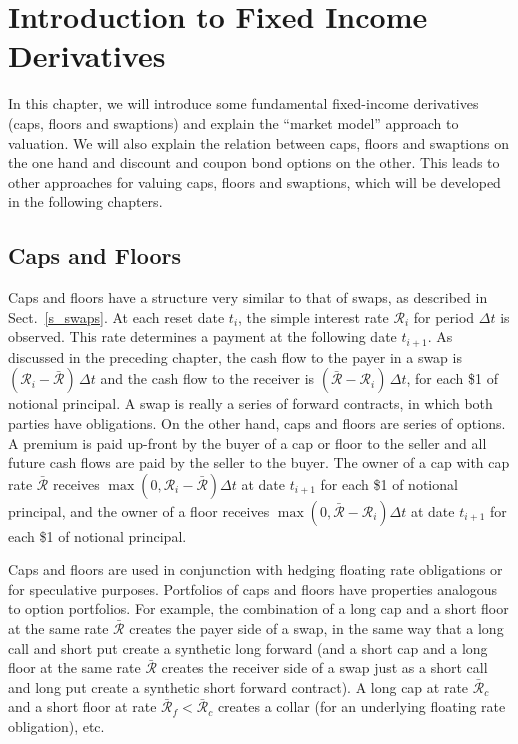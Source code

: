 \chapter{Introduction to Fixed Income Derivatives}\label{c_fixedincomederivatives}

In this chapter, we will introduce some fundamental fixed-income derivatives (caps, floors and swaptions) and explain the ``market model'' approach to valuation.  We will also explain the relation between caps, floors and swaptions on the one hand and discount and coupon bond options on the other.  This leads to other approaches for valuing caps, floors and swaptions, which will be developed in the following chapters.  

\section{Caps and Floors}

Caps  and floors  have a structure very similar to that of swaps, as described in Sect.~\ref{s_swaps}.  At each reset date $t_i$, the simple interest rate $\mathcal{R}_i$ for period $\varDelta t$ is observed.  This rate determines a payment at the following date $t_{i+1}$.  As discussed in the preceding chapter, the cash flow to the payer in a swap is $(\mathcal{R}_i - \bar{\mathcal{R}})\,\varDelta t$ and the cash flow to the receiver is $(\bar{\mathcal{R}}-\mathcal{R}_i)\,\varDelta t$, for each \$1 of notional principal.  A swap is really a series of forward contracts, in which both parties have obligations.  On the other hand, caps and floors are series of options.  A premium is paid up-front by the buyer of a cap or floor to the seller and all future cash flows are paid by the seller to the buyer.  The owner of a cap with cap rate $\bar{\mathcal{R}}$ receives $\max(0,\mathcal{R}_i-\bar{\mathcal{R}})\varDelta t$ at date $t_{i+1}$ for each \$1 of notional principal, and the owner of a floor receives $\max(0,\bar{\mathcal{R}}-\mathcal{R}_i)\varDelta t$ at date $t_{i+1}$ for each \$1 of notional principal.  


Caps and floors are used in conjunction with hedging floating rate obligations or for speculative purposes.  Portfolios of caps and floors have properties analogous to option portfolios.  For example, the combination of a long cap and a short floor at the same rate $\bar{\mathcal{R}}$ creates the payer side of a swap, in the same way that a long call and short put create a synthetic long forward (and a short cap and a long floor at the same rate $\bar{\mathcal{R}}$ creates the receiver side of a swap just as a short call and long put create a synthetic short forward contract).  A long cap at rate $\bar{\mathcal{R}}_c$ and a short floor at rate $\bar{\mathcal{R}}_f < \bar{\mathcal{R}}_c$ creates a collar  (for an underlying floating rate obligation), etc.

